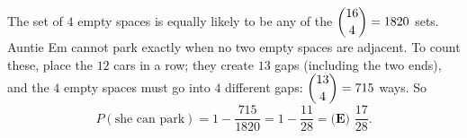 The set of $4$ empty spaces is equally likely to be any of the $\dbinom{16}4=1820$ sets. Auntie Em cannot park exactly when no two empty spaces are adjacent. To count these, place the $12$ cars in a row; they create $13$ gaps (including the two ends), and the $4$ empty spaces must go into $4$ different gaps: $\dbinom{13}4=715$ ways. So
\[P(\text{she can park})=1-\dfrac{715}{1820}=1-\dfrac{11}{28}=\boxed{\textbf{(E) }\dfrac{17}{28}}.\]
